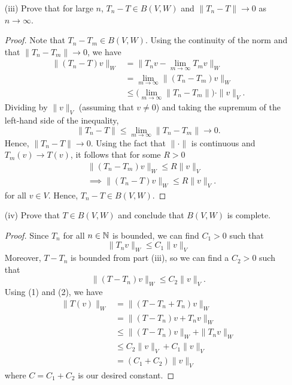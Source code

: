 \documentclass[a4paper]{article}
\begin{document}
\begin{enumerate}
    \item[(iii)] Prove that for large \( n  \), \( {T}_{n} - T \in B(V,W)  \) and \( \|{T}_{n} - T \| \to  0  \) as \( n \to \infty  \).
        \begin{proof}
            Note that \( {T}_{n} - {T}_{m} \in B(V,W) \). Using the continuity of the norm and that \( \|{T}_{n} - {T}_{m}\| \to 0  \), we have
            \begin{align*}
                \|({T}_{n} - T)v \|_W &= \| {T}_{n}v - \lim_{ m \to \infty  }  {T}_{m}v \|_W \\ 
                                    &= \lim_{ m \to \infty  }  \|({T}_{n} - {T}_{m}) v \|_W  \\
                                    &\leq \Big( \lim_{ m \to \infty  }  \|{T}_{n} - {T}_{m} \| \Big) \cdot \|v\|_V.
        \end{align*}
        Dividing by \( \|v\|_V \) (assuming that \( v \neq 0  \)) and taking the supremum of the left-hand side of the inequality, 
        \[  \|{T}_{n} - T \| \leq \lim_{ m \to \infty  }  \|{T}_{n} - {T}_{m}\| \to 0.   \]
        Hence, \( \|{T}_{n} - T \| \to 0  \). Using the fact that \( \|\cdot\|  \) is continuous and \( {T}_{m}(v) \to T(v) \), it follows that for some \( R > 0  \)
        \begin{align*}
            &\|({T}_{n} - {T}_{m}) v \|_W  \leq R \|v\|_V\\
            &\implies \|({T}_{n} - T ) v \|_W \leq R \|v\|_V.
        \end{align*}
        for all \( v \in V  \). Hence, \( {T}_{n} - T \in B(V,W) \).
        
        \end{proof}
    \item[(iv)] Prove that \( T \in B(V,W) \) and conclude that \( B(V,W) \) is complete.
    \begin{proof}
    Since \( {T}_{n}  \) for all \( n \in \mathbb{N}  \) is bounded, we can find \( {C}_{1} > 0  \) such that   
    \[  \|{T}_{n}v\|_W \leq {C}_{1} \|v\|_V \tag{1} \]
    Moreover, \( T - {T }_{n}  \) is bounded from part (iii), so we can find a 
    \( {C}_{2} > 0  \) such that 
    \[  \| (T - {T}_{n}) v\|_W \leq {C}_{2} \|v\|_V. \]
    Using (1) and (2), we have
    \begin{align*}
        \|T(v)\|_W &= \|(T - {T}_{n} + {T}_{n})v \|_W \\
                   &= \|(T - {T}_{n})v + {T}_{n}v\|_W \\
                   &\leq \|(T -{T}_{n})v \|_W + \|{T}_{n}v \|_W \\
                   &\leq {C}_{2} \|v\|_V + {C}_{1} \|v\|_V \\
                   &= ({C}_{1} + {C}_{2}) \|v\|_V
    \end{align*}
    where \( C = {C}_{1} + {C}_{2} \) is our desired constant.
    \end{proof}
\end{enumerate}
\end{document}

